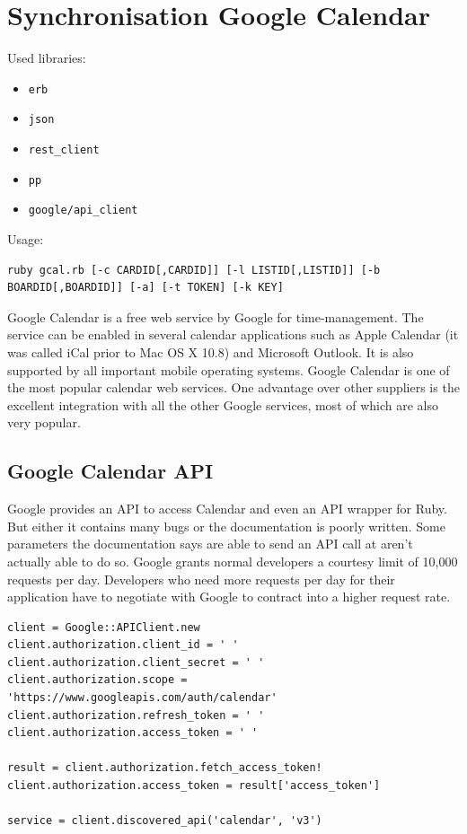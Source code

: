 \section{Synchronisation Google Calendar}
Used libraries:
\begin{itemize}
	\item \texttt{erb}
	\item \texttt{json}
	\item \texttt{rest\_client}
	\item \texttt{pp}
	\item \texttt{google/api\_client}
\end{itemize}

Usage:
\begin{lstlisting}[aboveskip=1\baselineskip, style=bash, caption=\texttt{gcal.rb} usage., label=listing025]
ruby gcal.rb [-c CARDID[,CARDID]] [-l LISTID[,LISTID]] [-b BOARDID[,BOARDID]] [-a] [-t TOKEN] [-k KEY]
\end{lstlisting}

Google Calendar is a free web service by Google for time-management. The service can be enabled in several calendar applications such as Apple Calendar (it was called iCal prior to Mac OS X 10.8) and Microsoft Outlook. It is also supported by all important mobile operating systems. Google Calendar is one of the most popular calendar web services. One advantage over other suppliers is the excellent integration with all the other Google services, most of which are also very popular.

\subsection{Google Calendar API}
Google provides an API to access Calendar and even an API wrapper for Ruby. But either it contains many bugs or the documentation is poorly written. Some parameters the documentation says are able to send an API call at aren't actually able to do so. Google grants normal developers a courtesy limit of 10,000 requests per day. Developers who need more requests per day for their application have to negotiate with Google to contract into a higher request rate.

\begin{lstlisting}[aboveskip=1\baselineskip, caption=Initialisation of the Google Calendar API connection., label=listing017]
client = Google::APIClient.new
client.authorization.client_id = ' '
client.authorization.client_secret = ' '
client.authorization.scope = 'https://www.googleapis.com/auth/calendar'
client.authorization.refresh_token = ' '
client.authorization.access_token = ' '

result = client.authorization.fetch_access_token!
client.authorization.access_token = result['access_token']

service = client.discovered_api('calendar', 'v3')
\end{lstlisting}

